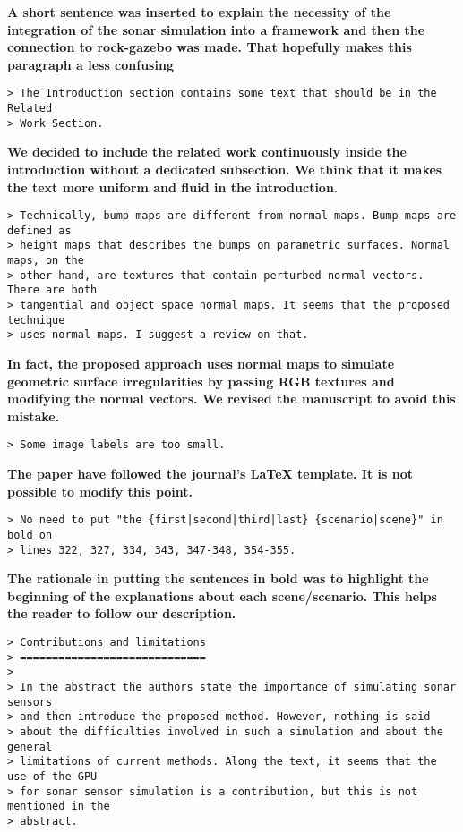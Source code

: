 \documentclass{article}
\begin{document}
\textbf{A short sentence was inserted to explain the necessity of the integration of the
sonar simulation into a framework and then the connection to rock-gazebo was made.
That hopefully makes this paragraph a less confusing}

\begin{verbatim}
> The Introduction section contains some text that should be in the Related
> Work Section.
\end{verbatim}

\textbf{We decided to include the related work continuously inside the introduction
without a dedicated subsection. We think that it makes the text more uniform and fluid
in the introduction.}

\begin{verbatim}
> Technically, bump maps are different from normal maps. Bump maps are defined as
> height maps that describes the bumps on parametric surfaces. Normal maps, on the
> other hand, are textures that contain perturbed normal vectors. There are both
> tangential and object space normal maps. It seems that the proposed technique
> uses normal maps. I suggest a review on that.
\end{verbatim}

\textbf{In fact, the proposed approach uses normal maps to simulate geometric surface 
irregularities by passing RGB textures and modifying the normal vectors. We revised the 
manuscript to avoid this mistake.}

\begin{verbatim}
> Some image labels are too small.
\end{verbatim}

\textbf{The paper have followed the journal's LaTeX template. It is not possible to modify
this point.}

\begin{verbatim}
> No need to put "the {first|second|third|last} {scenario|scene}" in bold on
> lines 322, 327, 334, 343, 347-348, 354-355.
\end{verbatim}

\textbf{The rationale in putting the sentences in bold was to highlight the beginning
of the explanations about each scene/scenario. This helps the reader to follow our 
description.}

\begin{verbatim}
> Contributions and limitations
> =============================
>
> In the abstract the authors state the importance of simulating sonar sensors
> and then introduce the proposed method. However, nothing is said
> about the difficulties involved in such a simulation and about the general
> limitations of current methods. Along the text, it seems that the use of the GPU
> for sonar sensor simulation is a contribution, but this is not mentioned in the
> abstract.
\end{verbatim}
\end{document}
